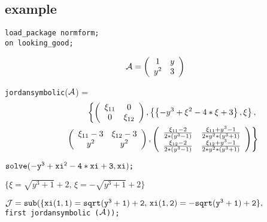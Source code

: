 \subsection{example}

{\tt load\_package normform;}\\
{\tt on looking\_good;}

\begin{displaymath}
{\cal A} = \left( \begin{array}{cc} 1 & y \\ y^2 & 3  \end{array}
\right)
\end{displaymath}

{\tt jordansymbolic}(${\cal A}$) =
\begin{eqnarray}
 & & \left\{ \left( \begin{array}{cc} \xi_{11} & 0 \\ 0 & \xi_{12}
\end{array} \right) ,
\left\{ \left\{ -y^3+\xi^2-4*\xi+3 \right\}, \xi \right\}, \right.
\nonumber \\ & & \hspace{0.1in} \left. \left( \begin{array}{cc}
\xi_{11} -3 & \xi_{12} -3 \\ y^2 & y^2
\end{array} \right), \left( \begin{array}{cc} \frac{\xi_{11} -2}
{2*(y^3-1)} & \frac{\xi_{11} + y^3 -1}{2*y^2*(y^3+1)} \\
\frac{\xi_{12} -2}{2*(y^3-1)} & \frac{\xi_{12}+y^3-1}{2*y^2*(y^3+1)}
\end{array} \right) \right\} \nonumber
\end{eqnarray}

\vspace{0.2in}
\begin{flushleft}
\begin{math}
{\tt solve(-y^3+xi^2-4*xi+3,xi)}${\tt ;}$
\end{math}
\end{flushleft}

\vspace{0.1in}
\begin{center}
\begin{math}
\{ \xi = \sqrt{y^3+1} + 2,\, \xi = -\sqrt{y^3+1}+2 \}
\end{math}
\end{center}

\vspace{0.1in}
\begin{math}
{\tt {\cal J}  = sub}{\tt (}{\tt \{ xi(1,1)=sqrt(y^3+1)+2,\, xi(1,2) =
-sqrt(y^3+1)+2\},}
\end{math}
\\ \hspace*{0.29in} {\tt first  jordansymbolic (${\cal A}$));}

